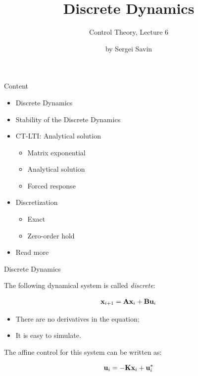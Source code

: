 \documentclass{beamer}
\title{Discrete Dynamics}
\subtitle{Control Theory, Lecture 6}
\author{by Sergei Savin}
\date{\mydate}
\begin{document}
\maketitle


\begin{frame}{Content}

\begin{itemize}
\item Discrete Dynamics
\item Stability of the Discrete Dynamics
\item CT-LTI: Analytical solution
\begin{itemize}
    \item Matrix exponential
    \item Analytical solution
    \item Forced response
\end{itemize}
\item Discretization
\begin{itemize}
	\item Exact
	\item Zero-order hold
\end{itemize}
\item Read more
\end{itemize}

\end{frame}





\begin{frame}{Discrete Dynamics}
\begin{flushleft}

The following dynamical system is called \emph{discrete}:

\begin{equation}
    \mathbf{x}_{i+1} = \mathbf{A}\mathbf{x}_i + \mathbf{B}\mathbf{u}_i
\end{equation}


\begin{itemize}
    \item There are no derivatives in the equation;
    \item It is easy to simulate.
\end{itemize}

\bigskip

The affine control for this system can be written as:

\begin{equation}
    \mathbf{u}_i = -\mathbf{K}\mathbf{x}_i + \mathbf{u}_i^*
\end{equation}

\end{flushleft}
\end{frame}
\end{document}
